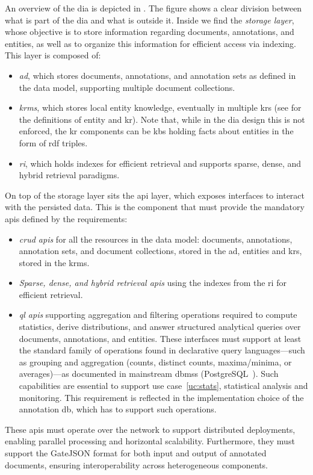 An overview of the \acl{dia} is depicted in . The figure shows a clear division between what is part of the \ac{dia} and what is outside it.
Inside we find the \emph{storage layer}, whose objective is to store information regarding documents, annotations, and entities, as well as to organize this information for efficient access via indexing.
This layer is composed of:
\begin{itemize}
  \item \emph{\Acf{ad}}, which stores documents, annotations, and annotation sets as defined in the data model, supporting multiple document collections.
  \item \emph{\Acf{krms}}, which stores local entity knowledge, eventually in multiple \aclp{kr} (see  for the definitions of entity and \acl{kr}). Note that, while in the \ac{dia} design this is not enforced, the \ac{kr} components can be \aclp{kb} holding facts about entities in the form of \acs{rdf} triples.
  \item \emph{\Acf{ri}}, which holds indexes for efficient retrieval and supports sparse, dense, and hybrid retrieval paradigms.
\end{itemize}

On top of the storage layer sits the \ac{api} layer, which exposes interfaces to interact with the persisted data. This is the component that must provide the mandatory \acp{api} defined by the requirements:
\begin{itemize}
  \renewcommand\labelitemi{$\diamond$}
  \item \emph{\ac{crud} \acp{api}} for all the resources in the data model: documents, annotations, annotation sets, and document collections, stored in the \ac{ad}, entities and \aclp{kr}, stored in the \ac{krms}.
  \item \emph{Sparse, dense, and hybrid retrieval \acp{api}} using the indexes from the \ac{ri} for efficient retrieval.
  \item \emph{\acl{ql} \acp{api}} supporting aggregation and filtering operations required to compute statistics, derive distributions, and answer structured analytical queries over documents, annotations, and entities. These interfaces must support at least the standard family of operations found in declarative query languages---such as grouping and aggregation (\eg counts, distinct counts, maxima/minima, or averages)---as documented in mainstream \acp{dbms} (\eg PostgreSQL~\cite{postgresql-agg-doc}). Such capabilities are essential to support use case~\ref{uc:stats}, \ie statistical analysis and monitoring. This requirement is reflected in the implementation choice of the annotation \ac{db}, which has to support such operations.
\end{itemize}
These \acp{api} must operate over the network to support distributed deployments, enabling parallel processing and horizontal scalability. Furthermore, they must support the GateJSON format for both input and output of annotated documents, ensuring interoperability across heterogeneous components.

